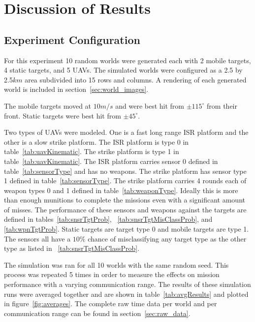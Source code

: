 \chapter{Discussion of Results}
\label{chap:results}
\section{Experiment Configuration}
For this experiment 10 random worlds were generated each with 2 mobile targets, 4 static targets, and 5 UAVs.  The simulated worlds were configured as a 2.5 by 2.5$km$ area subdivided into 15 rows and columns.  A rendering of each generated world is included in section~\ref{sec:world_images}.

The mobile targets moved at $10m/s$ and were best hit from $\pm115^{\circ}$ from their front.  Static targets were best hit from $\pm45^{\circ}$.

Two types of UAVs were modeled.  One is a fast long range ISR platform and the other is a slow strike platform.  The ISR platform is type 0 in table~\ref{tab:uavKinematic}.  The strike platform is type 1 in table~\ref{tab:uavKinematic}.  The ISR platform carries sensor 0 defined in table~\ref{tab:sensorType} and has no weapons.  The strike platform has sensor type 1 defined in table~\ref{tab:sensorType}.  The strike platform carries 4 rounds each of weapon types 0 and 1 defined in table~\ref{tab:weaponType}.  Ideally this is more than enough munitions to complete the missions even with a significant amount of misses.  The performance of these sensors and weapons against the targets are defined in tables~\ref{tab:snsrTgtProb}, ~\ref{tab:snsrTgtMisClassProb}, and \ref{tab:wpnTgtProb}.  Static targets are target type 0 and mobile targets are type 1.  The sensors all have a $10\%$ chance of misclassifying any target type as the other type as listed in ~\ref{tab:snsrTgtMisClassProb}.

The simulation was ran for all 10 worlds with the same random seed.  This process was repeated 5 times in order to measure the effects on mission performance with a varying communication range.  The results of these simulation runs were averaged together and are shown in table~\ref{tab:avgResults} and plotted in figure~\ref{fig:averages}.  The complete raw time data per world and per communication range can be found in section~\ref{sec:raw_data}.

